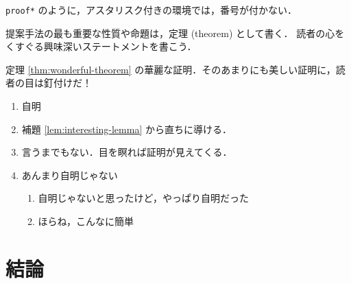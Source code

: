 \documentclass[sharedthmnum]{sumiilab-paper}
\begin{document}
\begin{proof*}
  \lstinline|proof*| のように，アスタリスク付きの環境では，番号が付かない．
\end{proof*}

\begin{theorem}
  \label{thm:wonderful-theorem}
  提案手法の最も重要な性質や命題は，定理 (theorem) として書く．
  読者の心をくすぐる興味深いステートメントを書こう．
\end{theorem}

\begin{proof*}
  定理 \ref{thm:wonderful-theorem} の華麗な証明．そのあまりにも美しい証明に，読者の目は釘付けだ！
  \begin{enumerate}[leftmargin=0pt,itemindent=*,label=Case \arabic*.]
  \item 自明
  \item 補題 \ref{lem:interesting-lemma} から直ちに導ける．
  \item 言うまでもない．目を瞑れば証明が見えてくる．
  \item あんまり自明じゃない
    \begin{enumerate}[label=(\roman*)]
    \item 自明じゃないと思ったけど，やっぱり自明だった
    \item ほらね，こんなに簡単
    \end{enumerate}
  \end{enumerate}
\end{proof*}

\chapter{結論}



\end{document}
